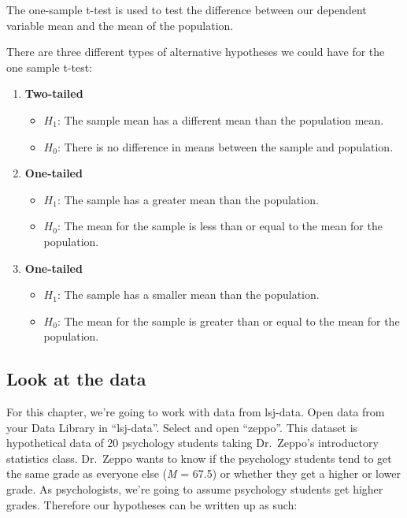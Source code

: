 \documentclass[
]{book}
\providecommand{\tightlist}{%
  \setlength{\itemsep}{0pt}\setlength{\parskip}{0pt}}
\begin{document}
The one-sample t-test is used to test the difference between our dependent variable mean and the mean of the population.

There are three different types of alternative hypotheses we could have for the one sample t-test:

\begin{enumerate}
\def\labelenumi{\arabic{enumi}.}
\item
  \textbf{Two-tailed}

  \begin{itemize}
  \tightlist
  \item
    \(H_1\): The sample mean has a different mean than the population mean.
  \item
    \(H_0\): There is no difference in means between the sample and population.
  \end{itemize}
\item
  \textbf{One-tailed}

  \begin{itemize}
  \tightlist
  \item
    \(H_1\): The sample has a greater mean than the population.
  \item
    \(H_0\): The mean for the sample is less than or equal to the mean for the population.
  \end{itemize}
\item
  \textbf{One-tailed}

  \begin{itemize}
  \tightlist
  \item
    \(H_1\): The sample has a smaller mean than the population.
  \item
    \(H_0\): The mean for the sample is greater than or equal to the mean for the population.
  \end{itemize}
\end{enumerate}

\hypertarget{look-at-the-data}{%
\subsection{Look at the data}\label{look-at-the-data}}

For this chapter, we're going to work with data from lsj-data. Open data from your Data Library in ``lsj-data''. Select and open ``zeppo''. This dataset is hypothetical data of 20 psychology students taking Dr.~Zeppo's introductory statistics class. Dr.~Zeppo wants to know if the psychology students tend to get the same grade as everyone else (\emph{M} = 67.5) or whether they get a higher or lower grade. As psychologists, we're going to assume psychology students get higher grades. Therefore our hypotheses can be written up as such:
\end{document}
